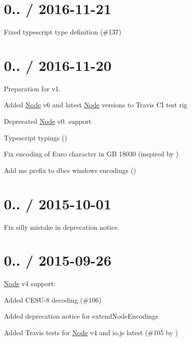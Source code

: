 \section*{0.. / 2016-\/11-\/21}


\begin{DoxyItemize}
\item Fixed typescript type definition (\#137)
\end{DoxyItemize}

\section*{0.. / 2016-\/11-\/20}


\begin{DoxyItemize}
\item Preparation for v1.
\item Added \mbox{\hyperlink{classNode}{Node}} v6 and latest \mbox{\hyperlink{classNode}{Node}} versions to Travis CI test rig
\item Deprecated \mbox{\hyperlink{classNode}{Node}} v0. support
\item Typescript typings ()
\item Fix encoding of Euro character in GB 18030 (inspired by )
\item Add ms prefix to dbcs windows encodings ()
\end{DoxyItemize}

\section*{0.. / 2015-\/10-\/01}


\begin{DoxyItemize}
\item Fix silly mistake in deprecation notice.
\end{DoxyItemize}

\section*{0.. / 2015-\/09-\/26}


\begin{DoxyItemize}
\item \mbox{\hyperlink{classNode}{Node}} v4 support\+:
\begin{DoxyItemize}
\item Added C\+E\+S\+U-\/8 decoding (\#106)
\item Added deprecation notice for {\ttfamily extend\+Node\+Encodings}
\item Added Travis tests for \mbox{\hyperlink{classNode}{Node}} v4 and io.\+js latest (\#105 by )
\end{DoxyItemize}
\end{DoxyItemize}

